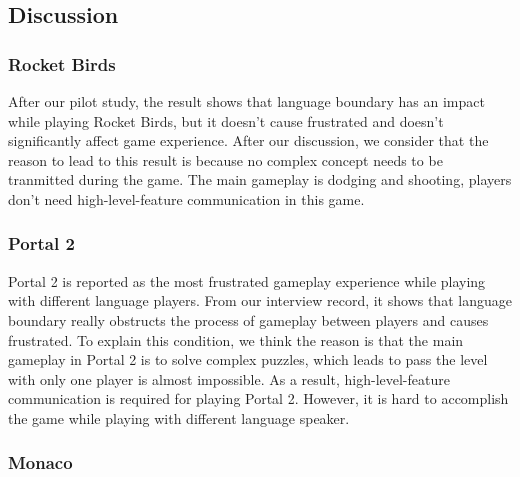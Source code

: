 \subsection{Discussion}
\subsubsection{Rocket Birds}

After our pilot study, the result shows that language boundary has an impact while playing Rocket Birds, but it doesn't cause frustrated and doesn't significantly affect game experience. After our discussion, we consider that the reason to lead to this result is because no complex concept needs to be tranmitted during the game. The main gameplay is dodging and shooting, players don't need high-level-feature communication in this game.


\subsubsection{Portal 2}

Portal 2 is reported as the most frustrated gameplay experience while playing with different language players. From our interview record, it shows that language boundary really obstructs the process of gameplay between players and causes frustrated. To explain this condition, we think the reason is that the main gameplay in Portal 2 is to solve complex puzzles, which leads to pass the level with only one player is almost impossible. As a result, high-level-feature communication is required for playing Portal 2. However, it is hard to accomplish the game while playing with different language speaker.


\subsubsection{Monaco}

